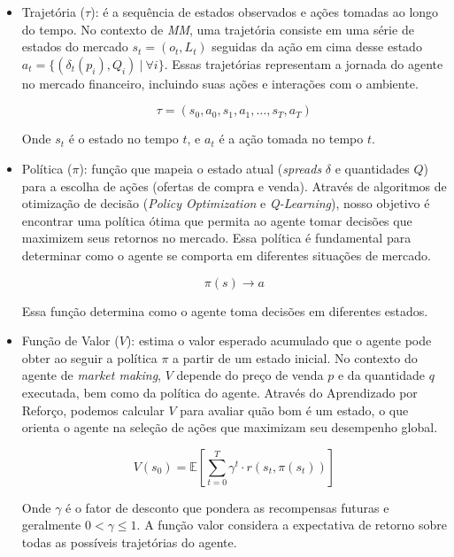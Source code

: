\begin{itemize}
	\item Trajetória ($\tau$): é a sequência de estados observados e ações tomadas ao longo do tempo. No contexto de \textit{MM}, uma trajetória consiste em uma série de estados do mercado $s_{t} = (o_{t}, L_{t})$ seguidas da ação em cima desse estado $a_{t} = \{(\delta_{t}(p_{i}), Q_{i}) \ | \ \forall i \}$. Essas trajetórias representam a jornada do agente no mercado financeiro, incluindo suas ações e interações com o ambiente.
	
	\[
	\tau = (s_0, a_0, s_1, a_1, \ldots, s_T, a_T)
	\]
	
	Onde \(s_t\) é o estado no tempo \(t\), e \(a_t\) é a ação tomada no tempo \(t\).
	
	\item Política ($\pi$): função que mapeia o estado atual (\textit{spreads} $\delta$ e quantidades $Q$) para a escolha de ações (ofertas de compra e venda). Através de algoritmos de otimização de decisão (\textit{Policy Optimization} e \textit{Q-Learning}), nosso objetivo é encontrar uma política ótima que permita ao agente tomar decisões que maximizem seus retornos no mercado. Essa política é fundamental para determinar como o agente se comporta em diferentes situações de mercado.
	
	\[
	\pi(s) \rightarrow a
	\]
	
	Essa função determina como o agente toma decisões em diferentes estados.
	
	\item Função de Valor ($V$): estima o valor esperado acumulado que o agente pode obter ao seguir a política \(\pi\) a partir de um estado inicial. No contexto do agente de \textit{market making}, $V$ depende do preço de venda $p$ e da quantidade $q$ executada, bem como da política do agente. Através do Aprendizado por Reforço, podemos calcular \(V\) para avaliar quão bom é um estado, o que orienta o agente na seleção de ações que maximizam seu desempenho global.
	
	\begin{equation*}
		V(s_0) = \mathbb{E}\left[\sum_{t=0}^{T} \gamma^t \cdot r(s_t, \pi(s_t)) \right]
		\end{equation*}
	
	Onde $\gamma$ é o fator de desconto que pondera as recompensas futuras e geralmente $0 < \gamma \leq 1$. A função valor considera a expectativa de retorno sobre todas as possíveis trajetórias do agente.
\end{itemize}


